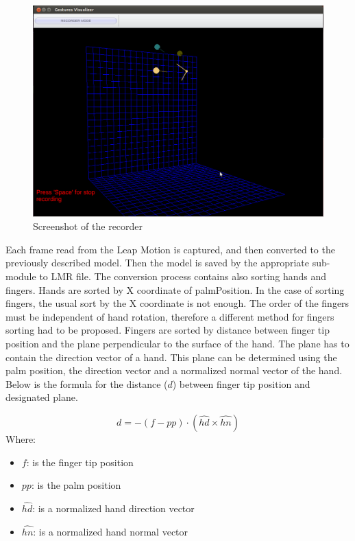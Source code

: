 \begin{figure}[htb]
\centering
 \includegraphics[width=1\columnwidth]{figures/recorder.png}
 \caption{Screenshot of the recorder}
 \label{recorder}
\end{figure}

Each frame read from the Leap Motion is captured, and then converted to the previously described model. Then the model is saved by the appropriate sub-module to LMR file. The conversion process contains also sorting hands and fingers. Hands are sorted by X coordinate of palmPosition. In the case of sorting fingers, the usual sort by the X coordinate is not enough. The order of the fingers must be independent of hand rotation, therefore a different method for fingers sorting had to be proposed. Fingers are sorted by distance between finger tip position and the plane perpendicular to the surface of the hand. The plane has to contain the direction vector of a hand. This plane can be determined using the palm position, the direction vector and a normalized normal vector of the hand.
Below is the formula for the distance ($d$) between finger tip position and designated plane.

\[ d = -(f - pp) \cdot (\hat{hd} \times \hat{hn}) \]
Where:
\begin{itemize}
    \item[] $f$: is the finger tip position
    \item[] $pp$: is the palm position
    \item[] $\hat{hd}$: is a normalized hand direction vector
    \item[] $\hat{hn}$: is a normalized hand normal vector
\end{itemize}

